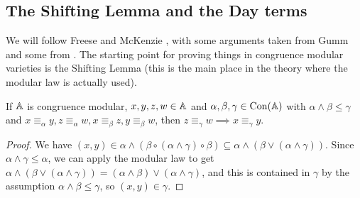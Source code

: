 \documentclass[letterpaper,11pt]{article}
\DeclareMathOperator{\Con}{Con}
\begin{document}
\subsection{The Shifting Lemma and the Day terms}\label{s-shifting}

We will follow Freese and McKenzie \cite{commutator-theory}, with some arguments taken from Gumm \cite{gumm-geometric} and some from \cite{commutator-notes}. The starting point for proving things in congruence modular varieties is the Shifting Lemma (this is the main place in the theory where the modular law is actually used).

\begin{lem} If $\mathbb{A}$ is congruence modular, $x,y,z,w \in \mathbb{A}$ and $\alpha,\beta,\gamma \in \Con(\bA)$ with $\alpha \wedge \beta \le \gamma$ and $x \equiv_\alpha y, z\equiv_\alpha w, x \equiv_\beta z, y\equiv_\beta w$, then $z \equiv_\gamma w \implies x \equiv_\gamma y$.
\begin{center}
\end{center}
\end{lem}
\begin{proof} We have $(x,y) \in \alpha \wedge (\beta \circ (\alpha \wedge \gamma) \circ \beta) \subseteq \alpha \wedge (\beta \vee (\alpha \wedge \gamma))$. Since $\alpha \wedge \gamma \le \alpha$, we can apply the modular law to get $\alpha \wedge (\beta \vee (\alpha \wedge \gamma)) = (\alpha \wedge \beta) \vee (\alpha \wedge \gamma)$, and this is contained in $\gamma$ by the assumption $\alpha \wedge \beta \le \gamma$, so $(x,y) \in \gamma$.
\end{proof}
\end{document}
